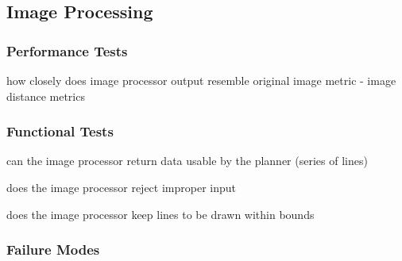 
\subsection{Image Processing}
\label{sec:verification_image}


\subsubsection{Performance Tests}
\label{sec:image_pt}

how closely does image processor output resemble original image
metric - image distance metrics

\subsubsection{Functional Tests}
\label{sec:image_ft}

can the image processor return data usable by the planner (series of lines)

does the image processor reject improper input

does the image processor keep lines to be drawn within bounds

\subsubsection{Failure Modes}
\label{sec:image_fm}

